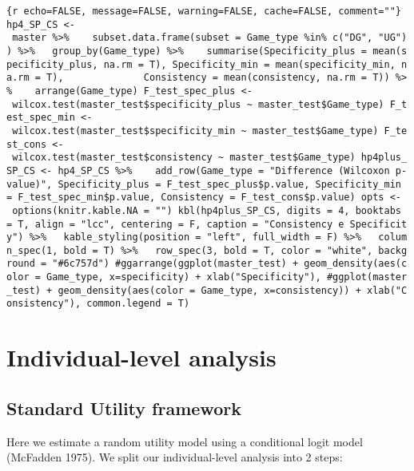 \texttt{\{r\ echo=FALSE,\ message=FALSE,\ warning=FALSE,\ cache=FALSE,\ comment=""\}\ hp4\_SP\_CS\ \textless{}-\ master\ \%\textgreater{}\%\ \ \ \ subset.data.frame(subset\ =\ Game\_type\ \%in\%\ c("DG",\ "UG"))\ \%\textgreater{}\%\ \ \ group\_by(Game\_type)\ \%\textgreater{}\%\ \ \ \ summarise(Specificity\_plus\ =\ mean(specificity\_plus,\ na.rm\ =\ T),\ Specificity\_min\ =\ mean(specificity\_min,\ na.rm\ =\ T),\ \ \ \ \ \ \ \ \ \ \ \ \ \ Consistency\ =\ mean(consistency,\ na.rm\ =\ T))\ \%\textgreater{}\%\ \ \ \ arrange(Game\_type)\ F\_test\_spec\_plus\ \textless{}-\ wilcox.test(master\_test\$specificity\_plus\ \textasciitilde{}\ master\_test\$Game\_type)\ F\_test\_spec\_min\ \textless{}-\ wilcox.test(master\_test\$specificity\_min\ \textasciitilde{}\ master\_test\$Game\_type)\ F\_test\_cons\ \textless{}-\ wilcox.test(master\_test\$consistency\ \textasciitilde{}\ master\_test\$Game\_type)\ hp4plus\_SP\_CS\ \textless{}-\ hp4\_SP\_CS\ \%\textgreater{}\%\ \ \ \ add\_row(Game\_type\ =\ "Difference\ (Wilcoxon\ p-value)",\ Specificity\_plus\ =\ F\_test\_spec\_plus\$p.value,\ Specificity\_min\ =\ F\_test\_spec\_min\$p.value,\ Consistency\ =\ F\_test\_cons\$p.value)\ opts\ \textless{}-\ options(knitr.kable.NA\ =\ "")\ kbl(hp4plus\_SP\_CS,\ digits\ =\ 4,\ booktabs\ =\ T,\ align\ =\ "lcc",\ centering\ =\ F,\ caption\ =\ "Consistency\ e\ Specificity")\ \%\textgreater{}\%\ \ \ kable\_styling(position\ =\ "left",\ full\_width\ =\ F)\ \%\textgreater{}\%\ \ \ column\_spec(1,\ bold\ =\ T)\ \%\textgreater{}\%\ \ \ row\_spec(3,\ bold\ =\ T,\ color\ =\ "white",\ background\ =\ "\#6c757d")\ \#ggarrange(ggplot(master\_test)\ +\ geom\_density(aes(color\ =\ Game\_type,\ x=specificity)\ +\ xlab("Specificity"),\ \#ggplot(master\_test)\ +\ geom\_density(aes(color\ =\ Game\_type,\ x=consistency))\ +\ xlab("Consistency"),\ common.legend\ =\ T)}

\hypertarget{individual-level-analysis}{%
\section{Individual-level analysis}\label{individual-level-analysis}}

\hypertarget{standard-utility-framework}{%
\subsection{Standard Utility
framework}\label{standard-utility-framework}}

Here we estimate a random utility model using a conditional logit model
(McFadden 1975). We split our individual-level analysis into 2 steps:

